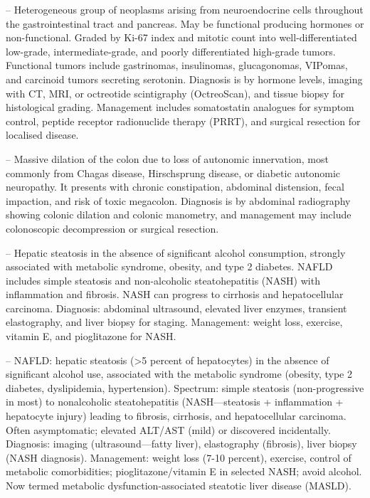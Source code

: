 -- Heterogeneous group of neoplasms arising from neuroendocrine cells throughout the gastrointestinal tract and pancreas. May be functional producing hormones or non-functional. Graded by Ki-67 index and mitotic count into well-differentiated low-grade, intermediate-grade, and poorly differentiated high-grade tumors. Functional tumors include gastrinomas, insulinomas, glucagonomas, VIPomas, and carcinoid tumors secreting serotonin. Diagnosis is by hormone levels, imaging with CT, MRI, or octreotide scintigraphy (OctreoScan), and tissue biopsy for histological grading. Management includes somatostatin analogues for symptom control, peptide receptor radionuclide therapy (PRRT), and surgical resection for localised disease.

-- Massive dilation of the colon due to loss of autonomic innervation, most commonly from Chagas disease, Hirschsprung disease, or diabetic autonomic neuropathy. It presents with chronic constipation, abdominal distension, fecal impaction, and risk of toxic megacolon. Diagnosis is by abdominal radiography showing colonic dilation and colonic manometry, and management may include colonoscopic decompression or surgical resection.

-- Hepatic steatosis in the absence of significant alcohol consumption, strongly associated with metabolic syndrome, obesity, and type 2 diabetes. NAFLD includes simple steatosis and non-alcoholic steatohepatitis (NASH) with inflammation and fibrosis. NASH can progress to cirrhosis and hepatocellular carcinoma. Diagnosis: abdominal ultrasound, elevated liver enzymes, transient elastography, and liver biopsy for staging. Management: weight loss, exercise, vitamin E, and pioglitazone for NASH.

-- NAFLD: hepatic steatosis (>5 percent of hepatocytes) in the absence of significant alcohol use, associated with the metabolic syndrome (obesity, type 2 diabetes, dyslipidemia, hypertension). Spectrum: simple steatosis (non-progressive in most) to nonalcoholic steatohepatitis (NASH—steatosis + inflammation + hepatocyte injury) leading to fibrosis, cirrhosis, and hepatocellular carcinoma. Often asymptomatic; elevated ALT/AST (mild) or discovered incidentally. Diagnosis: imaging (ultrasound—fatty liver), elastography (fibrosis), liver biopsy (NASH diagnosis). Management: weight loss (7-10 percent), exercise, control of metabolic comorbidities; pioglitazone/vitamin E in selected NASH; avoid alcohol. Now termed metabolic dysfunction-associated steatotic liver disease (MASLD).


